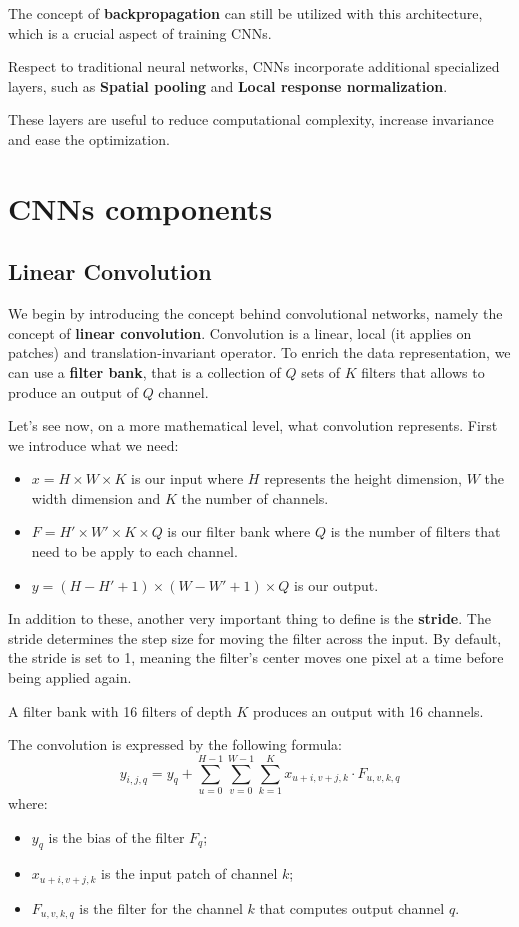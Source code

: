 The concept of \textbf{backpropagation} can still be utilized with this
architecture, which is a crucial aspect of training CNNs.

Respect to traditional neural networks, CNNs incorporate additional specialized
layers, such as \textbf{Spatial pooling} and \textbf{Local response normalization}.

These layers are useful to reduce computational complexity, increase invariance
and ease the optimization.
\section{CNNs components}
\subsection{Linear Convolution}
We begin by introducing the concept behind convolutional networks, namely the
concept of \textbf{linear convolution}. Convolution is a linear, local
(it applies on patches) and translation-invariant operator. To enrich the data
representation, we can use a \textbf{filter bank}, that is a collection of $Q$
sets of $K$ filters that allows to produce an output of $Q$ channel.

Let's see now, on a more mathematical level, what convolution represents. First we
introduce what we need:
\begin{itemize}
    \item $x = H \times W \times K$ is our input where $H$ represents the height
          dimension, $W$ the width dimension and $K$ the number of channels.
    \item $F = H' \times W' \times K \times Q$ is our filter bank where $Q$ is
          the number of filters that need to be apply to each channel.
    \item $y = (H - H' + 1) \times (W - W' + 1) \times Q$ is our output.
\end{itemize}

In addition to these, another very important thing to define is the \textbf{stride}.
The stride determines the step size for moving the filter across the input. By
default, the stride is set to 1, meaning the filter's center moves one pixel at
a time before being applied again.

\begin{note}
    A filter bank with 16 filters of depth $K$ produces an output with 16 channels.
\end{note}

The convolution is expressed by the following formula:
\begin{equation}
    y_{i, j, q} = y_q + \sum_{u = 0}^{H - 1}\sum_{v = 0}^{W - 1}\sum_{k = 1}^{K} x_{u + i, v + j, k} \cdot F_{u, v, k, q}
\end{equation}
where:
\begin{itemize}
    \item $y_q$ is the bias of the filter $F_q$;
    \item $x_{u + i, v + j, k}$ is the input patch of channel $k$;
    \item $F_{u, v, k, q}$ is the filter for the channel $k$ that computes output
          channel $q$.
\end{itemize}

